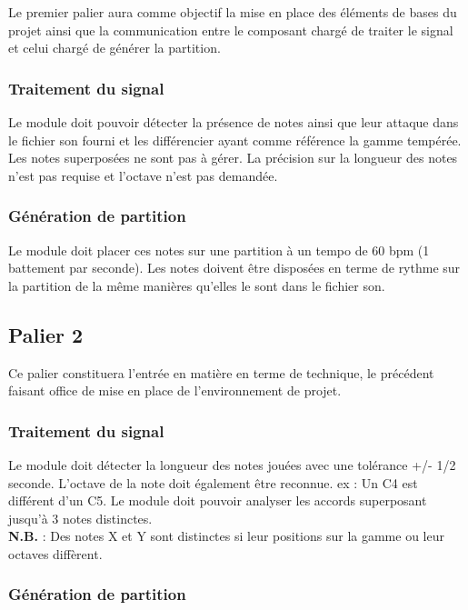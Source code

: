 \documentclass[12pt]{article}
\begin{document}
Le premier palier aura comme objectif la mise en place des éléments de bases du projet ainsi que la communication entre le composant chargé de traiter le signal et celui chargé de générer la partition.\\

\subsubsection{Traitement du signal}

Le module doit pouvoir détecter la présence de notes ainsi que leur attaque dans le fichier son fourni et les différencier ayant comme référence la gamme tempérée. Les notes superposées ne sont pas à gérer. La précision sur la longueur des notes n'est pas requise et l’octave n’est pas demandée.

\subsubsection{Génération de partition}

Le module doit placer ces notes sur une partition à un tempo de 60 bpm (1 battement par seconde). Les notes doivent être disposées en terme de rythme sur la partition de la même manières qu'elles le sont dans le fichier son.

\newpage
\subsection{Palier 2}

Ce palier constituera l’entrée en matière en terme de technique, le précédent faisant office de mise en place de l’environnement de projet. \\

\subsubsection{Traitement du signal}

Le module doit détecter la longueur des notes jouées avec une tolérance +/- 1/2 seconde. L’octave de la note doit également être reconnue. ex : Un C4 est différent d’un C5. Le module doit pouvoir analyser les accords superposant jusqu’à 3 notes distinctes.\\

\textbf{N.B.} : Des notes X et Y sont distinctes si leur positions sur la gamme ou leur octaves diffèrent.

\subsubsection{Génération de partition}
\end{document}
